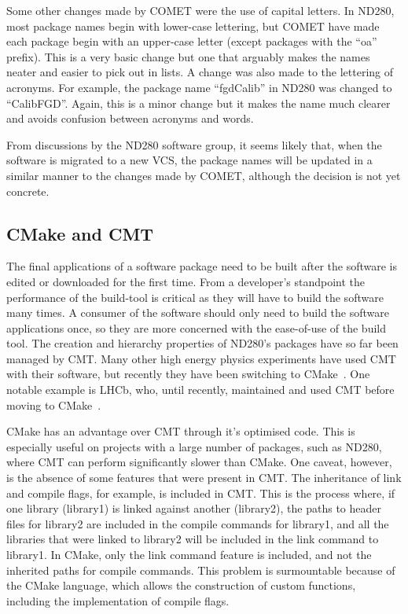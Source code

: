 \documentclass[aps,pra,12pt,notitlepage,tightenlines]{revtex4-1}
\begin{document}
Some other changes made by COMET were the use of capital letters. In ND280, most package names begin with lower-case lettering, but COMET have made each package begin with an upper-case letter (except packages with the ``oa'' prefix). This is a very basic change but one that arguably makes the names neater and easier to pick out in lists. A change was also made to the lettering of acronyms. For example, the package name ``fgdCalib'' in ND280 was changed to ``CalibFGD''. Again, this is a minor change but it makes the name much clearer and avoids confusion between acronyms and words.

From discussions by the ND280 software group, it seems likely that, when the software is migrated to a new VCS, the package names will be updated in a similar manner to the changes made by COMET, although the decision is not yet concrete.

\subsection{CMake and CMT}
The final applications of a software package need to be built after the software is edited or downloaded for the first time. From a developer's standpoint the performance of the build-tool is critical as they will have to build the software many times. A consumer of the software should only need to build the software applications once, so they are more concerned with the ease-of-use of the build tool. The creation and hierarchy properties of ND280's packages have so far been managed by CMT. Many other high energy physics experiments have used CMT with their software, but recently they have been switching to CMake~\cite{CMake}. One notable example is LHCb, who, until recently, maintained and used CMT before moving to CMake~\cite{Clemencic2012}.

CMake has an advantage over CMT through it's optimised code. This is especially useful on projects with a large number of packages, such as ND280, where CMT can perform significantly slower than CMake. One caveat, however, is the absence of some features that were present in CMT. The inheritance of link and compile flags, for example, is included in CMT. This is the process where, if one library (library1) is linked against another (library2), the paths to header files for library2 are included in the compile commands for library1, and all the libraries that were linked to library2 will be included in the link command to library1. In CMake, only the link command feature is included, and not the inherited paths for compile commands. This problem is surmountable because of the CMake language, which allows the construction of custom functions, including the implementation of compile flags. 
\end{document}
